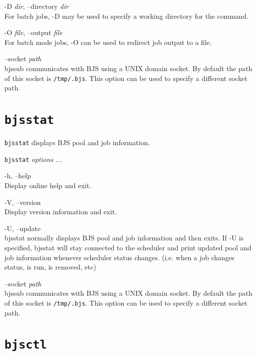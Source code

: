 \documentclass[oneside]{book}
\begin{document}
\begin{description}
\item{-D \textit{dir}, --directory \textit{dir}}\\
  For batch jobs, -D may be used to specify a working directory for
  the command.

\item{-O \textit{file}, --output \textit{file}}\\
  For batch mode jobs, -O can be used to redirect job output to a file.

\item{--socket \textit{path}}\\
  bjssub communicates with BJS using a UNIX domain socket.  By default
  the path of this socket is \texttt{/tmp/.bjs}.  This option can be
  used to specify a different socket path.

\end{description}


\section{\texttt{bjsstat}}

\texttt{bjsstat} displays BJS pool and job information.

\texttt{bjsstat} \emph{options ...}
\begin{description}
\item{-h, --help}\\
  Display online help and exit.

\item{-V, --version}\\
  Display version information and exit.

\item{-U, --update}\\

  bjsstat normally displays BJS pool and job information and then
  exits.  If -U is specified, bjsstat will stay connected to the
  scheduler and print updated pool and job information whenever
  scheduler status changes.  (i.e. when a job changes status, is run,
  is removed, etc)

\item{--socket \textit{path}}\\
  bjssub communicates with BJS using a UNIX domain socket.  By default
  the path of this socket is \texttt{/tmp/.bjs}.  This option can be
  used to specify a different socket path.
\end{description}

\section{\texttt{bjsctl}}
\end{document}
